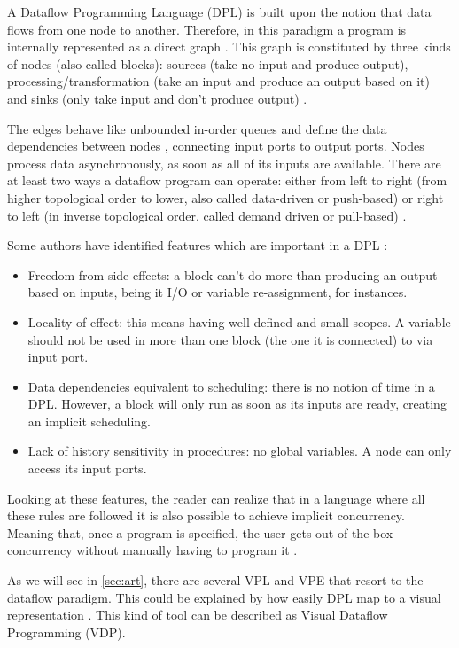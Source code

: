 A Dataflow Programming Language (DPL) is built upon the notion that data flows
from one node to another. Therefore, in this paradigm a program is internally
represented as a direct graph \cite{Hils1992}. This graph is constituted by
three kinds of nodes (also called blocks): sources (take no input and produce
output), processing/transformation (take an input and produce an output based
on it) and sinks (only take input and don't produce output) \cite{Sousa2012}.

The edges behave like unbounded in-order queues and define the data dependencies
between nodes \cite{Johnston2004}, connecting input ports to output ports. Nodes process data asynchronously, as soon
as all of its inputs are available. There are at least two ways a dataflow program
can operate: either from left to right (from higher topological order to lower,
also called data-driven or push-based) or right to left (in inverse topological order, called
demand driven or pull-based) \cite{Johnston2004}.

Some authors have identified features which are important in a DPL
\cite{ackerman1982data}\cite{wail1995can}:

\begin{itemize}
  \item Freedom from side-effects: a block can't do more than producing an
output based on inputs, being it I/O or variable re-assignment, for instances.
  \item Locality of effect: this means having well-defined and small scopes. A
variable should not be used in more than one block (the one it is connected) to
via input port.
  \item Data dependencies equivalent to scheduling: there is no notion
of time in a DPL. However, a block will only run as soon as its inputs are ready,
creating an implicit scheduling.
  \item Lack of history sensitivity in procedures: no global variables. A node
can only access its input ports.
\end{itemize}

Looking at these features, the reader can realize that in a language where all
these rules are followed it is also possible to achieve implicit concurrency.
Meaning that, once a program is specified, the user gets out-of-the-box concurrency
without manually having to program it \cite{Sousa2012}.

As we will see in \ref{sec:art}, there are several VPL and VPE that resort to the
dataflow paradigm. This could be explained by how easily DPL map to
a visual representation \cite{Johnston2004}. This kind of tool can be described
as Visual Dataflow Programming (VDP).

